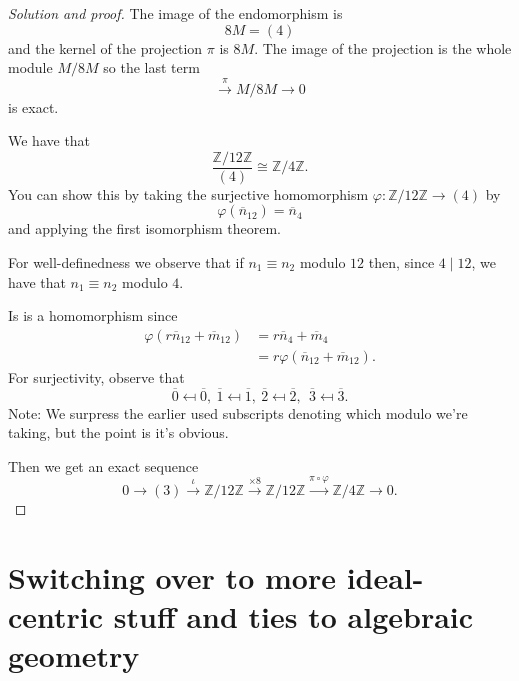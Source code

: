 \documentclass[11pt]{article}
\begin{document}
\begin{proof}[Solution and proof]
    The image of the endomorphism is 
    \[
        8M = (4) 
    \]
    and the kernel of the 
    projection $\pi$ is $8M$. 
    The image of the projection is the whole 
    module $M/8M$ so the last term 
    \[
        \overset\pi\to M/8M \to 0
    \]
    is exact. 

    We have that 
    \[
        \frac{\mathbb Z/12\mathbb Z}{(4)}
        \cong \mathbb Z/4\mathbb Z. 
    \] 
    You can show this by 
    taking the surjective homomorphism 
    $\varphi : \mathbb Z/12\mathbb Z \to (4)$ 
    by 
    \[
        \varphi(\overline n_{12}) = \overline n_{4}
    \]
    and applying the first isomorphism theorem. 

    For well-definedness we observe that 
    if $n_1 \equiv n_2$ modulo $12$ then, since $4 \mid 12$, 
    we have that $n_1 \equiv n_2$ modulo $4$. 

    Is is a homomorphism since 
    \begin{align*}
        \varphi(r\overline n_{12} + \overline m_{12}) 
        &= r\overline n_4 + \overline m_4 \\ 
        &= r\varphi(\overline n_{12} + \overline m_{12}). 
    \end{align*}
    For surjectivity, observe that 
    \[
        \overline 0 \mapsfrom \overline 0, 
        \ \overline 1 \mapsfrom \overline 1, 
        \ \overline 2 \mapsfrom \overline 2, \
        \ \overline 3 \mapsfrom \overline 3.  
    \]
    Note: We surpress the earlier used 
    subscripts denoting which modulo we're taking, but 
    the point is it's obvious.

    Then we get an exact sequence 
    \[
        0 \to (3) \overset\iota\to \mathbb Z/12\mathbb Z 
        \overset{\times8}{\to} \mathbb Z/12\mathbb Z 
        \overset{\pi \circ \varphi}\to \mathbb Z/4 
        \mathbb Z \to 0.  
    \]
\end{proof}


\section{Switching over to more ideal-centric stuff and ties to algebraic geometry}
\end{document}
